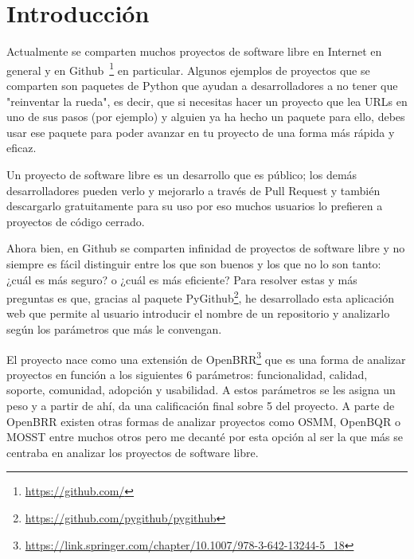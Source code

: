 \documentclass[a4paper, 12pt]{book}
\begin{document}
\tableofcontents 
\cleardoublepage
\listoffigures %



\cleardoublepage
\chapter{Introducción}
\label{chap:introducción}
\label{sec:intro} %

Actualmente se comparten muchos proyectos de software libre en Internet en general y en Github~\cite{website:GitHub}\footnote{\url{https://github.com/}} en particular. Algunos ejemplos de proyectos que se comparten son paquetes de Python que
ayudan a desarrolladores a no tener que "reinventar la rueda", es decir, que si necesitas hacer un proyecto que lea URLs en uno de sus pasos (por ejemplo) y alguien ya ha hecho un paquete para
ello, debes usar ese paquete para poder avanzar en tu proyecto de una forma más rápida y eficaz.

Un proyecto de software libre es un desarrollo que es público; los demás desarrolladores pueden verlo y mejorarlo a través de Pull Request y también descargarlo gratuitamente para su uso por eso muchos usuarios lo prefieren a proyectos de código cerrado.

Ahora bien, en Github se comparten infinidad de proyectos de software libre y no siempre es fácil distinguir entre los que son buenos y los que no lo son tanto: ¿cuál es más seguro? o ¿cuál es más eficiente?
Para resolver estas y más preguntas es que, gracias al paquete PyGithub\footnote{\url{https://github.com/pygithub/pygithub}}, he desarrollado esta aplicación web que permite al usuario introducir el nombre de un repositorio y analizarlo según los parámetros que más
le convengan.

El proyecto\cite{website:RepositorioTFG}  nace como una extensión de OpenBRR\footnote{\url{https://link.springer.com/chapter/10.1007/978-3-642-13244-5_18}} que es una forma de analizar proyectos en función a los siguientes 6 parámetros: funcionalidad, calidad, soporte, comunidad, adopción y usabilidad.
A estos parámetros se les asigna un peso y a partir de ahí, da una calificación final sobre 5 del proyecto. A parte de OpenBRR existen otras formas de analizar proyectos como OSMM, OpenBQR o MOSST entre muchos otros pero me decanté por esta opción al ser la que más se 
centraba en analizar los proyectos de software libre.
\end{document}
